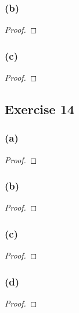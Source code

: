 \documentclass[14pt]{extarticle}
\begin{document}
\subsubsection{(b)}

\begin{proof}

\end{proof}

\subsubsection{(c)}

\begin{proof}

\end{proof}

\subsection{Exercise 14}

\subsubsection{(a)}

\begin{proof}

\end{proof}

\subsubsection{(b)}

\begin{proof}

\end{proof}

\subsubsection{(c)}

\begin{proof}

\end{proof}

\subsubsection{(d)}

\begin{proof}

\end{proof}
\end{document}

